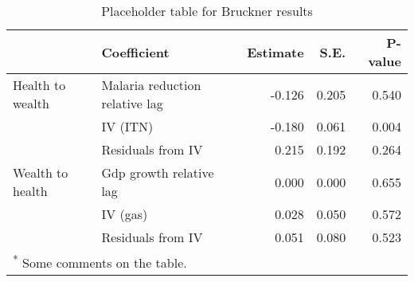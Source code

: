 \begin{table}

\caption{\label{tab:}Placeholder table for Bruckner results}
\centering
\begin{tabular}[t]{llrrr}
\toprule
 & Coefficient & Estimate & S.E. & P-value\\
\midrule
Health to wealth & Malaria reduction relative lag & -0.126 & 0.205 & 0.540\\
 & IV (ITN) & -0.180 & 0.061 & 0.004\\
 & Residuals from IV & 0.215 & 0.192 & 0.264\\
Wealth to health & Gdp growth relative lag & 0.000 & 0.000 & 0.655\\
 & IV (gas) & 0.028 & 0.050 & 0.572\\
 & Residuals from IV & 0.051 & 0.080 & 0.523\\
\bottomrule
\multicolumn{5}{l}{\textsuperscript{*} Some comments on the table.}\\
\end{tabular}
\end{table}